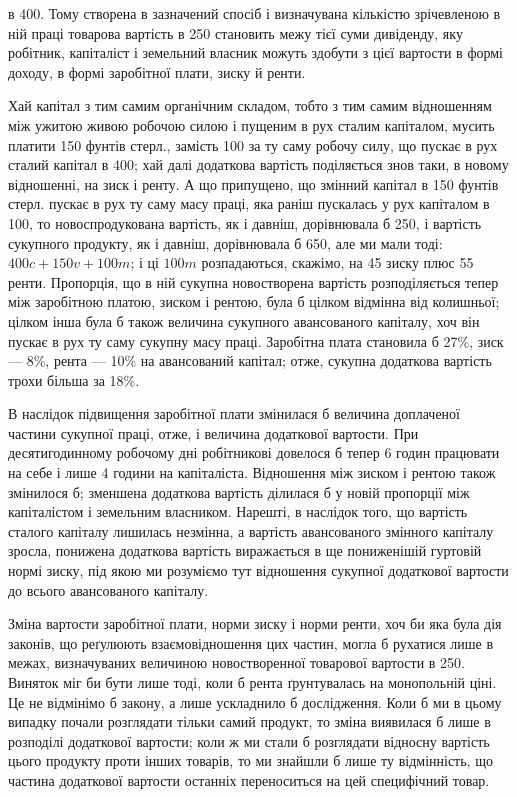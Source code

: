 \parcont{}  %
в 400. Тому створена в зазначений спосіб і визначувана кількістю зрічевленою
в ній праці товарова вартість в 250 становить межу тієї суми дивіденду,
яку робітник, капіталіст і земельний власник можуть здобути з цієї вартости
в формі доходу, в формі заробітної плати, зиску й ренти.

Хай капітал з тим самим органічним складом, тобто з тим самим відношенням
між ужитою живою робочою силою і пущеним в рух сталим капіталом,
мусить платити 150 фунтів стерл., замість 100 за ту саму робочу силу,
що пускає в рух сталий капітал в 400; хай далі додаткова вартість поділяється
знов таки, в новому відношенні, на зиск і ренту. А що припущено,
що змінний капітал в 150 фунтів стерл. пускає в рух ту саму масу праці,
яка раніш пускалась у рух капіталом в 100, то новоспродукована вартість, як
і давніш, дорівнювала б 250, і вартість сукупного продукту, як і давніш, дорівнювала
б 650, але ми мали тоді: $400c + 150v + 100m$; і ці $100m$ розпадаються,
скажімо, на 45 зиску плюс 55 ренти. Пропорція, що в ній сукупна новостворена
вартість розподіляється тепер між заробітною платою, зиском і рентою,
була б цілком відмінна від колишньої; цілком інша була б також величина
сукупного авансованого капіталу, хоч він пускає в рух ту саму сукупну масу
праці. Заробітна плата становила б 27\%, зиск — 8\%, рента — 10\% на
авансований капітал; отже, сукупна додаткова вартість трохи більша за 18\%.

В наслідок підвищення заробітної плати змінилася б величина доплаченої
частини сукупної праці, отже, і величина додаткової вартости. При десятигодинному
робочому дні робітникові довелося б тепер 6 годин працювати на
себе і лише 4 години на капіталіста. Відношення між зиском і рентою також
змінилося б; зменшена додаткова вартість ділилася б у новій пропорції між
капіталістом і земельним власником. Нарешті, в наслідок того, що вартість
сталого капіталу лишилась незмінна, а вартість авансованого змінного капіталу
зросла, понижена додаткова вартість виражається в ще пониженішій гуртовій
нормі зиску, під якою ми розуміємо тут відношення сукупної додаткової вартости
до всього авансованого капіталу.

Зміна вартости заробітної плати, норми зиску і норми ренти, хоч би яка
була дія законів, що реґулюють взаємовідношення цих частин, могла б рухатися
лише в межах, визначуваних величиною новостворенної товарової вартости
в 250. Виняток міг би бути лише тоді, коли б рента ґрунтувалась на
монопольній ціні. Це не відмінімо б закону, а лише ускладнило б дослідження.
Коли б ми в цьому випадку почали розглядати тільки самий продукт, то зміна
виявилася б лише в розподілі додаткової вартости; коли ж ми стали б розглядати
відносну вартість цього продукту проти інших товарів, то ми знайшли б
лише ту відмінність, що частина додаткової вартости останніх переноситься на
цей специфічний товар.


